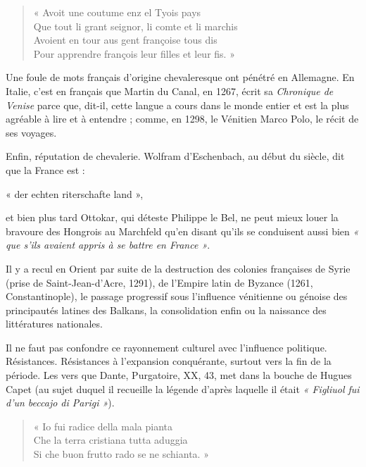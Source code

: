 \documentclass[french,twoside]{book} %
\def\bignobreak{\ifdim\lastskip<\bigskipamount
  \removelastskip\nopagebreak\bigskip\fi}
\newcommand{\labelblock}[1]{\bigskip{\color{rubric}\bfseries\centering #1\par}\bignobreak}
\newenvironment{quoteblock}%
  {\begin{quoting}}
  {\end{quoting}}
\newenvironment{quotebar}{%
    \def\FrameCommand{{\color{rubric!10!}\vrule width 0.5em} \hspace{0.9em}}%
    \def\OuterFrameSep{\itemsep} %
    \MakeFramed {\advance\hsize-\width \FrameRestore}
  }%
  {%
    \endMakeFramed
  }
\renewenvironment{quoteblock}%
  {%
    \small
    \savenotes
    \begin{quotebar}
  }
  {%
    \end{quotebar}
    \spewnotes
  }
\begin{document}
\begin{verse}
« Avoit une coutume enz el Tyois pays\\
Que tout li grant seignor, li comte et li marchis\\
Avoient en tour aus gent françoise tous dis\\
Pour apprendre françois leur filles et leur fis. »\\
\end{verse}

\noindent Une foule de mots français d’origine chevaleresque ont pénétré en Allemagne. En Italie, c’est en français que Martin du Canal, en 1267, écrit sa {\itshape Chronique de Venise} parce que, dit-il, cette langue a cours dans le monde entier et est la plus agréable à lire et à entendre ; comme, en 1298, le Vénitien Marco Polo, le récit de ses voyages.\par
Enfin, réputation de chevalerie. Wolfram d’Eschenbach, au début du siècle, dit que la France est :\par

\begin{quoteblock}
\noindent « der echten riterschafte land »,\end{quoteblock}

\noindent et bien plus tard Ottokar, qui déteste Philippe le Bel, ne peut mieux  
\label{p29} louer la bravoure des Hongrois au Marchfeld qu’en disant qu’ils se conduisent aussi bien \emph{« que s’ils avaient appris à se battre en France »}.\par
Il y a recul en Orient par suite de la destruction des colonies françaises de Syrie (prise de Saint-Jean-d’Acre, 1291), de l’Empire latin de Byzance (1261, Constantinople), le passage progressif sous l’influence vénitienne ou génoise des principautés latines des Balkans, la consolidation enfin ou la naissance des littératures nationales.\par

\labelblock{— Aspect politique.}

\noindent Il ne faut pas confondre ce rayonnement culturel avec l’influence politique. Résistances. Résistances à l’expansion conquérante, surtout vers la fin de la période. Les vers que Dante, Purgatoire, XX, 43, met dans la bouche de Hugues Capet (au sujet duquel il recueille la légende d’après laquelle il était \emph{« Figliuol fui d’un beccajo di Parigi »}).\par


\begin{verse}
« Io fui radice della mala pianta\\
Che la terra cristiana tutta aduggia\\
Si che buon frutto rado se ne schianta. »\\
\end{verse}
\end{document}
